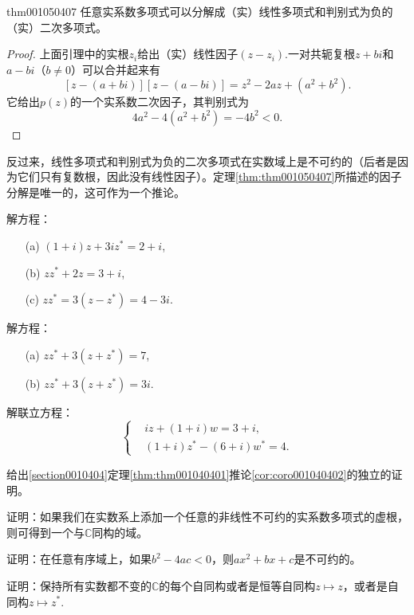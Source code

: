 \begin{theorem}{}{thm001050407}
任意实系数多项式可以分解成（实）线性多项式和判别式为负的（实）二次多项式。
\end{theorem}

\begin{proof}
上面引理中的实根$z_i$给出（实）线性因子$(z-z_i)$.一对共轭复根$z+bi$和$a-bi$（$b \neq 0$）可以合并起来有
\[
[z-(a+bi)][z-(a-bi)] = z^2 - 2az + (a^2+b^2).
\]
它给出$p(z)$的一个实系数二次因子，其判别式为
\[
4a^2 - 4(a^2+b^2) = -4b^2 < 0.
\]
\end{proof}

反过来，线性多项式和判别式为负的二次多项式在实数域上是不可约的（后者是因为它们只有复数根，因此没有线性因子）。定理\ref{thm:thm001050407}所描述的因子分解是唯一的，这可作为一个推论。


\begin{problemset}
\item 解方程：
\begin{enumerate}
\item[(a)] $(1+i)z + 3iz^* = 2+i$,
\item[(b)] $zz^* + 2z = 3+i$,
\item[(c)] $zz^* = 3(z-z^*) = 4-3i$.
\end{enumerate}

\item 解方程：
\begin{enumerate}
\item[(a)] $zz^* + 3(z+z^*) = 7$,
\item[(b)] $zz^* + 3(z+z^*) = 3i$.
\end{enumerate}

\item 解联立方程：
\[
\left\{
\begin{aligned}
&iz+(1+i)w = 3+i,\\
&(1+i)z^* - (6+i)w^* = 4.
\end{aligned}
\right.
\]

\item 给出\ref{section0010404}定理\ref{thm:thm001040401}推论\ref{cor:coro001040402}的独立的证明。

\item 证明：如果我们在实数系上添加一个任意的非线性不可约的实系数多项式的虚根，则可得到一个与$\mathbb{C}$同构的域。

\item 证明：在任意有序域上，如果$b^2-4ac < 0$，则$ax^2+bx+c$是不可约的。

\item 证明：保持所有实数都不变的$\mathbb{C}$的每个自同构或者是恒等自同构$z \mapsto z$，或者是自同构$z \mapsto z^*$.
\end{problemset}


